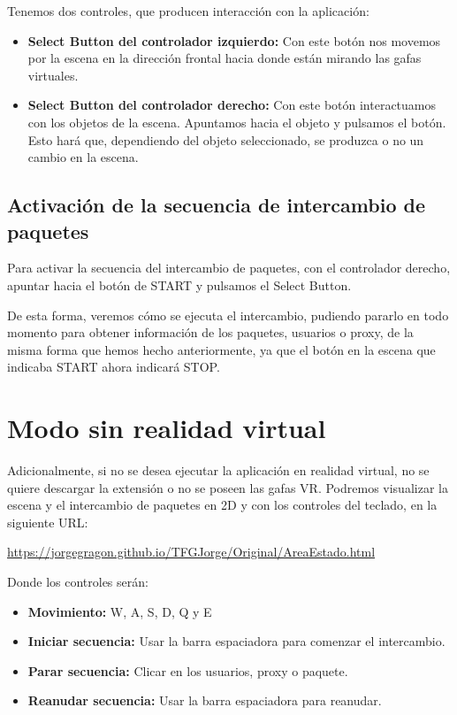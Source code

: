 \documentclass[a4paper, 12pt]{book}
\begin{document}
Tenemos dos controles, que producen interacción con la aplicación:
\begin{itemize}
  \item \textbf{Select Button del controlador izquierdo:} Con este botón nos movemos por la escena en la dirección frontal hacia donde están mirando las gafas virtuales.
  \item \textbf{Select Button del controlador derecho:} Con este botón interactuamos con los objetos de la escena. Apuntamos 
  hacia el objeto y pulsamos el botón. Esto hará que, dependiendo del 
  objeto seleccionado, se produzca o no un cambio en la escena.
\end{itemize}

\subsection{Activación de la secuencia de intercambio de paquetes}
Para activar la secuencia del intercambio de paquetes, con el controlador derecho, 
apuntar hacia el botón de START y pulsamos el Select Button.

De esta forma, veremos cómo se ejecuta el intercambio, pudiendo pararlo en todo 
momento para obtener información de los paquetes, usuarios o proxy, de la misma 
forma que hemos
hecho anteriormente, ya que el botón en la escena que indicaba START ahora 
indicará STOP.

\section{Modo sin realidad virtual}
Adicionalmente, si no se desea ejecutar la aplicación en realidad virtual, no se quiere descargar la extensión o no se poseen las gafas VR.
Podremos visualizar la escena y el intercambio de paquetes en 2D y con los controles del teclado, en la siguiente URL:

\url{https://jorgegragon.github.io/TFGJorge/Original/AreaEstado.html}

Donde los controles serán:

\begin{itemize}
  \item \textbf{Movimiento:} W, A, S, D, Q y E
  \item \textbf{Iniciar secuencia:} Usar la barra espaciadora para comenzar el intercambio.
  \item \textbf{Parar secuencia:} Clicar en los usuarios, proxy o paquete.
  \item \textbf{Reanudar secuencia:} Usar la barra espaciadora para reanudar.
\end{itemize}

\cleardoublepage



\end{document}
